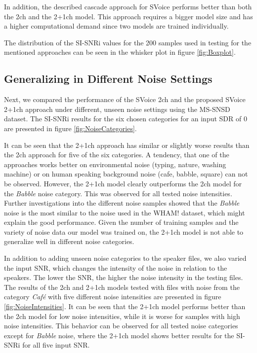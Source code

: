\documentclass{article}
\begin{document}
 In addition, the described cascade approach for SVoice performs better than both the 2ch and the 2+1ch model. This approach requires a bigger model size and has a higher computational demand since two models are trained individually.  
 

The distribution of the SI-SNRi values  for the 200 samples used in testing for the mentioned approaches can be seen in the whisker plot in figure \ref{fig:Boxplot}.

\subsection{Generalizing in Different Noise Settings}
\label{ssec:comparison_model_architectures}

Next, we compared the performance of the SVoice 2ch and the proposed SVoice 2+1ch approach under different, unseen noise settings using the MS-SNSD dataset. The SI-SNRi results for the six chosen categories for an input SDR of 0 are presented in figure \ref{fig:NoiseCategories}. 

It can be seen that the 2+1ch approach has similar or slightly worse results than the 2ch approach for five of the six categories. A tendency, that one of the approaches works better on environmental noise (typing, nature, washing machine) or on human speaking background noise (cafe, babble, square) can not be observed. However, the 2+1ch model clearly outperforms the 2ch model for the \textit{Babble} noise category. This was observed for all tested noise intensities. Further investigations into the different noise samples showed that the \textit{Babble} noise is the most similar to the noise used in the WHAM! dataset, which might explain the good performance. Given the number of training samples and the variety of noise data our model was trained on, the 2+1ch model is not able to generalize well in different noise categories. 

In addition to adding unseen noise categories to the speaker files, we also varied the input SNR, which changes the intensity of the noise in relation to the speakers. The lower the SNR, the higher the noise intensity in the testing files. The results of the 2ch and 2+1ch models tested with files with noise from the category \textit{Café} with five different noise intensities are presented in figure \ref{fig:NoiseIntensities}. It can be seen that the 2+1ch model performs better than the 2ch model for low noise intensities, while it is worse for samples with high noise intensities. This behavior can be observed for all tested noise categories except for \textit{Babble} noise, where the 2+1ch model shows better results for the SI-SNRi for all five input SNR.
\end{document}
